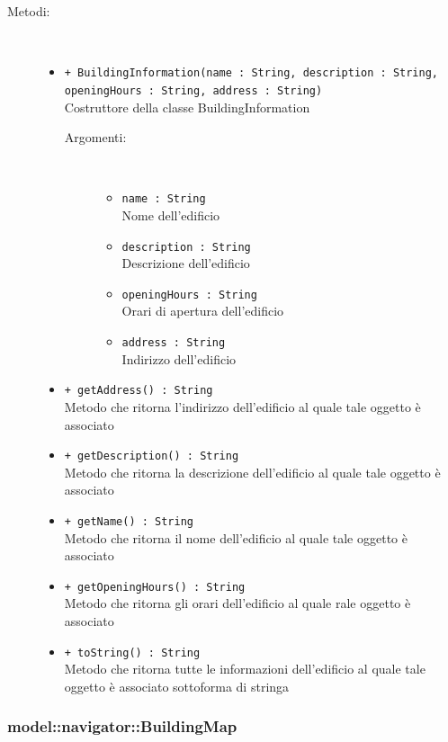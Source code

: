 \documentclass[../DefinizioneDiProdotto.tex]{subfiles}
\begin{document}
\begin{description}
\begin{itemize}
\end{itemize}
\item[Metodi:] \
\begin{itemize}
\item \texttt{+ BuildingInformation(name : String, description : String, openingHours : String, address : String)}\\
Costruttore della classe BuildingInformation
 \begin{description}
\item[Argomenti:] \
\begin{itemize}
\item \texttt{name : String}\\
Nome dell'edificio\item \texttt{description : String}\\
Descrizione dell'edificio\item \texttt{openingHours : String}\\
Orari di apertura dell'edificio\item \texttt{address : String}\\
Indirizzo dell'edificio\end{itemize}
\end{description}
\item \texttt{+ getAddress() : String}\\
Metodo che ritorna l'indirizzo dell'edificio al quale tale oggetto è associato
 \item \texttt{+ getDescription() : String}\\
Metodo che ritorna la descrizione dell'edificio al quale tale oggetto è associato
 \item \texttt{+ getName() : String}\\
Metodo che ritorna il nome dell'edificio al quale tale oggetto è associato
 \item \texttt{+ getOpeningHours() : String}\\
Metodo che ritorna gli orari dell'edificio al quale rale oggetto è associato
 \item \texttt{+ toString() : String}\\
Metodo che ritorna tutte le informazioni dell'edificio al quale tale oggetto è associato sottoforma di stringa
 \end{itemize}
\end{description}

\subsubsection{model::navigator::BuildingMap}
\end{document}
